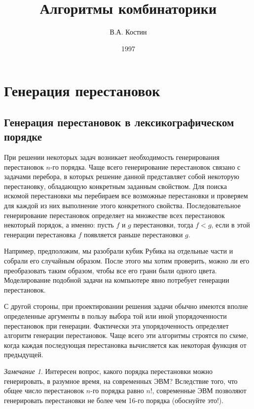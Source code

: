\documentclass[12pt,a4paper]{article}
\author{В.А. Костин}
\title{Алгоритмы комбинаторики}
\date{1997}
\theoremstyle{plain}
\theoremstyle{definition}
\theoremstyle{remark}
\newtheorem*{remark}{Замечание}
\begin{document}
\maketitle
\newpage

\tableofcontents

\section{Генерация перестановок}

\subsection{Генерация перестановок в лексикографическом порядке}
При решении некоторых задач возникает необходимость генерирования перестановок $n$-го порядка. Чаще всего генерирование перестановок связано с задачами перебора, в которых решение данной представляет собой некоторую перестановку, обладающую конкретным заданным свойством. Для поиска искомой перестановки мы перебираем все возможные перестановки и проверяем для каждой из них выполнение этого конкретного свойства. Последовательное генерирование перестановок определяет на множестве всех перестановок некоторый порядок, а именно: пусть $f$ и $g$ перестановки, тогда $f<g$, если в этой генерации перестановка $f$ появляется раньше перестановки $g$.

Например, предположим, мы разобрали кубик Рубика на отдельные части и собрали его случайным образом. После этого мы хотим проверить, можно ли его преобразовать таким образом, чтобы все его грани были одного цвета. Моделирование подобной задачи на компьютере явно потребует генерации перестановок.

С другой стороны, при проектировании решения задачи обычно имеются вполне определенные аргументы в пользу выбора той или иной упорядоченности перестановок при генерации. Фактически эта упорядоченность определяет алгоритм генерации перестановок. Чаще всего эти алгоритмы строятся по схеме, когда каждая последующая перестановка вычисляется как некоторая функция от предыдущей. 

\begin{remark}Интересен вопрос, какого порядка перестановки можно генерировать, в разумное время, на современных ЭВМ? Вследствие того, что общее число перестановок $n$-го порядка равно $n!$, современные ЭВМ позволяют генерировать перестановки не более чем 16-го порядка (обоснуйте это!).
\end{remark}
\end{document}
